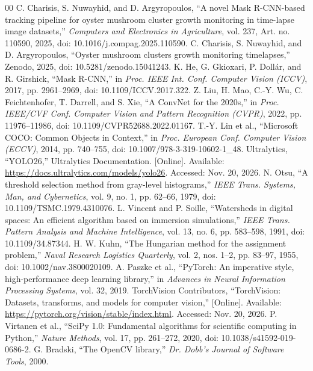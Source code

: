 \documentclass[11pt,a4paper]{article}
\begin{document}
\begin{thebibliography}{00}
 C. Charisis, S. Nuwayhid, and D. Argyropoulos, ``A novel Mask R-CNN-based tracking pipeline for oyster mushroom cluster growth monitoring in time-lapse image datasets,'' \emph{Computers and Electronics in Agriculture}, vol. 237, Art. no. 110590, 2025, doi: 10.1016/j.compag.2025.110590.
 C. Charisis, S. Nuwayhid, and D. Argyropoulos, ``Oyster mushroom clusters growth monitoring timelapses,'' Zenodo, 2025, doi: 10.5281/zenodo.15041243.
 K. He, G. Gkioxari, P. Doll\'ar, and R. Girshick, ``Mask R-CNN,'' in \emph{Proc. IEEE Int. Conf. Computer Vision (ICCV)}, 2017, pp. 2961--2969, doi: 10.1109/ICCV.2017.322.
 Z. Liu, H. Mao, C.-Y. Wu, C. Feichtenhofer, T. Darrell, and S. Xie, ``A ConvNet for the 2020s,'' in \emph{Proc. IEEE/CVF Conf. Computer Vision and Pattern Recognition (CVPR)}, 2022, pp. 11976--11986, doi: 10.1109/CVPR52688.2022.01167.
 T.-Y. Lin et al., ``Microsoft COCO: Common Objects in Context,'' in \emph{Proc. European Conf. Computer Vision (ECCV)}, 2014, pp. 740--755, doi: 10.1007/978-3-319-10602-1\_48.
 Ultralytics, ``YOLO26,'' Ultralytics Documentation. [Online]. Available: \url{https://docs.ultralytics.com/models/yolo26}. Accessed: Nov. 20, 2026.
 N. Otsu, ``A threshold selection method from gray-level histograms,'' \emph{IEEE Trans. Systems, Man, and Cybernetics}, vol. 9, no. 1, pp. 62--66, 1979, doi: 10.1109/TSMC.1979.4310076.
 L. Vincent and P. Soille, ``Watersheds in digital spaces: An efficient algorithm based on immersion simulations,'' \emph{IEEE Trans. Pattern Analysis and Machine Intelligence}, vol. 13, no. 6, pp. 583--598, 1991, doi: 10.1109/34.87344.
 H. W. Kuhn, ``The Hungarian method for the assignment problem,'' \emph{Naval Research Logistics Quarterly}, vol. 2, nos. 1--2, pp. 83--97, 1955, doi: 10.1002/nav.3800020109.
 A. Paszke et al., ``PyTorch: An imperative style, high-performance deep learning library,'' in \emph{Advances in Neural Information Processing Systems}, vol. 32, 2019.
 TorchVision Contributors, ``TorchVision: Datasets, transforms, and models for computer vision,'' [Online]. Available: \url{https://pytorch.org/vision/stable/index.html}. Accessed: Nov. 20, 2026.
 P. Virtanen et al., ``SciPy 1.0: Fundamental algorithms for scientific computing in Python,'' \emph{Nature Methods}, vol. 17, pp. 261--272, 2020, doi: 10.1038/s41592-019-0686-2.
 G. Bradski, ``The OpenCV library,'' \emph{Dr. Dobb's Journal of Software Tools}, 2000.
\end{thebibliography}
\end{document}
